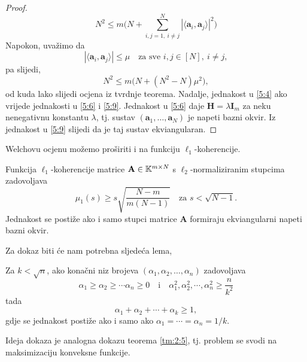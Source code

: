 \documentclass[a4paper,twoside,12pt]{memoir} %
\newcommand{\vect}[1]{\mathbf{#1}}
\renewcommand{\vec}{\vect}
\begin{document}
\begin{proof}
    \begin{equation}\label{5:8}
        N^2 \leq m \big( N + \sum_{i,j = 1,\ i \neq j}^N |\langle \vec a_i, \vec a_j \rangle|^2 \big)
    \end{equation}
    Napokon, uva\v{z}imo da 
    \begin{equation}\label{5:9}
        |\langle \vec a_i, \vec a_j \rangle| \leq \mu \quad \text{za sve }i,j \in [N],\ i \neq j,
    \end{equation}
    pa slijedi,
    \begin{equation*}
        N^2 \leq m \big( N + (N^2 - N)\mu^2 \big), 
    \end{equation*}
    od kuda lako slijedi ocjena iz tvrdnje teorema.
    Nadalje, jednakost u \eqref{5:4} ako vrijede jednakosti u \eqref{5:6} i \eqref{5:9}. Jednakost u \eqref{5:6} daje $\vec H = \lambda \vec I_m$ za neku nenegativnu konstantu $\lambda$, tj. sustav $(\vec a_1, \dots, \vec a_N)$ je napeti bazni okvir. Iz jednakost u \eqref{5:9} slijedi da je taj sustav ekviangularan.
\end{proof}

Welchovu ocjenu mo\v{z}emo pro\v{s}iriti i na funkciju $\ell_1$-koherencije.
\begin{thm}\label{tm:5:8}
    Funkcija $\ell_1$-koherencije matrice $\vec A \in \K^{m \times N}$ s $\ell_2$-normaliziranim stupcima zadovoljava 
    \begin{equation}\label{5:10}
        \mu_1(s) \geq s \sqrt{\frac{N-m}{m(N-1)}}\quad \text{za } s < \sqrt{N - 1}.
    \end{equation}
    Jednakost se posti\v{z}e ako i samo stupci matrice $\vec A$ formiraju ekviangularni napeti bazni okvir.
\end{thm}
Za dokaz biti \'ce nam potrebna sljede\'ca lema,
\begin{lem}\label{lem:5:9}
    Za $k < \sqrt{n}$, ako kona\v{c}ni niz brojeva $(\alpha_1, \alpha_2, \dots, \alpha_n)$ zadovoljava
    \begin{equation*}
        \alpha_1 \geq \alpha_2 \geq \cdots \alpha_n \geq 0 \quad \text{i} \quad \alpha_1^2,\alpha_2^2, \cdots,\alpha_n^2 \geq \frac{n}{k^2} 
    \end{equation*}
    tada
    \begin{equation*}
        \alpha_1 + \alpha_2 + \cdots + \alpha_k \geq 1, 
    \end{equation*}
    gdje se jednakost posti\v{z}e ako i samo ako $\alpha_1 = \cdots = \alpha_n = 1/k$.
\end{lem}
Ideja dokaza je analogna dokazu teorema \ref{tm:2:5}, tj. problem se svodi na maksimizaciju konveksne funkcije.
\end{document}
